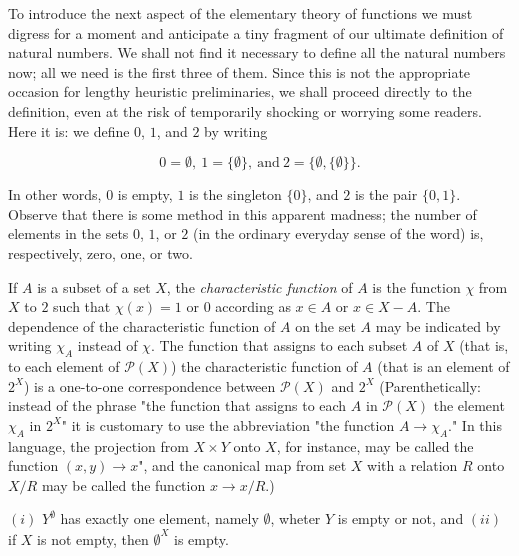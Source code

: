To introduce the next aspect of the elementary theory of functions we must digress for a moment and anticipate a tiny fragment of our ultimate definition of natural numbers. We shall not find it necessary to define all the natural numbers now; all we need is the first three of them. Since this is not the appropriate occasion for lengthy heuristic preliminaries, we shall proceed directly to the definition, even at the risk of temporarily shocking or worrying some readers. Here it is: we define  $0$, $1$, and $2$ by writing 

\begin{equation*}
0 = \emptyset , \: 1=\{ \emptyset \} , \: \text{and} \: 2 = \{ \emptyset , \{ \emptyset \} \} . 
\end{equation*}

In other words, $0$ is empty, $1$ is the singleton $\{ 0 \}$, and $2$ is the pair $ \{ 0, 1 \}$. Observe that there is some method in this apparent madness; the number of elements in the sets $0$, $1$, or $2$ (in the ordinary everyday sense of the word) is, respectively, zero, one, or two.   

If $A$ is a subset of a set $X$, the \textit{characteristic function} of $A$ is the function $\chi$ from $X$ to $2$ such that $\chi (x) = 1$ or $0$ according as $x \in A$ or $x \in X - A$. The dependence of the characteristic function of $A$ on the set $A$ may be indicated by writing $\chi_{A}$ instead of $\chi$. The function that assigns to each subset $A$ of $X$ (that is, to each element of $\mathcal{P}(X)$) the characteristic function of $A$ (that is an element of $2^{X}$) is a one-to-one correspondence between $\mathcal{P}(X)$ and $2^{X}$ (Parenthetically: instead of the phrase "the function that assigns to each $A$ in $\mathcal{P}(X)$ the element $\chi_{A}$ in $2^{X}$" it is customary to use the abbreviation "the function $A \rightarrow \chi_{A}$." In this language, the projection from $X \times Y$ onto $X$, for instance, may be called the function $(x, y) \rightarrow x$", and the canonical map from set $X$ with a relation $R$ onto $X/R$ may be called the function $x \rightarrow x/R$.) 

\begin{exercise} $(i)$ $Y^{\emptyset}$ has exactly one element, namely $\emptyset$, wheter $Y$ is empty or not, and $(ii)$ if $X$ is not empty, then $\emptyset^{X}$ is empty.

\end{exercise}